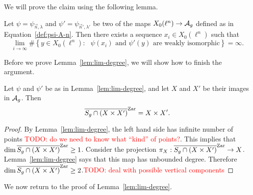 \documentclass{amsart}
\begin{document}
We will prove the claim using the following lemma.

\begin{lemma}\label{lem:lim-degree}
  Let $\psi = \psi_{\vec{n},\lambda}$ and $\psi' = \psi_{\vec{n}',\lambda'}$ be two of the maps $X_0(\ell^n) \to \mathcal{A}_g$ defined as in Equation~\ref{def:psi-A-n}. Then there exists a sequence $x_i \in X_0(\ell^n)$ such that
  \[
    \lim_{i \to \infty}\#\left\{ y \in X_0(\ell^n) \colon \text{ $\psi(x_i)$ and $\psi'(y)$ are weakly isomorphic} \right\} = \infty.
  \]
\end{lemma}

Before we prove Lemma~\ref{lem:lim-degree}, we will show how to finish the argument.

\begin{corollary}
  Let $\psi$ and $\psi'$ be as in Lemma~\ref{lem:lim-degree}, and let $X$ and $X'$ be their images in $\mathcal{A}_g$. Then
  \[
    \overline{S_g \cap (X \times X')}^\mathrm{Zar} = X \times X'.
  \]
\end{corollary}
\begin{proof}
  By Lemma~\ref{lem:lim-degree}, the left hand side has infinite number of points \textcolor{red}{TODO: do we need to know what ``kind'' of points?}. This implies that $\dim \overline{S_g \cap (X \times X')}^\mathrm{Zar} \geq 1$. Consider the projection $\pi_X: \overline{S_g \cap (X \times X')}^\mathrm{Zar} \to X$. Lemma~\ref{lem:lim-degree} says that this map has unbounded degree. Therefore $\dim \overline{S_g \cap (X \times X')}^\mathrm{Zar} \geq 2$.\textcolor{red}{TODO: deal with possible vertical components}
\end{proof}

We now return to the proof of Lemma~\ref{lem:lim-degree}.
\end{document}
